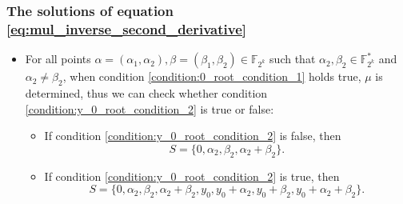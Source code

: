 \documentclass[
    aspectratio=169,                   %
]{beamer}
\newcommand{\Fks}{\mathbb{F}_{2^k}^*}
\newcommand{\Fk}{\mathbb{F}_{2^k}}
\begin{document}
    \begin{frame}
        \frametitle{The solutions of equation \eqref{eq:mul_inverse_second_derivative}}
        
        \begin{itemize}
            \item For all points $ \alpha=(\alpha_1,\alpha_2),\beta=(\beta_1,\beta_2)\in\Fk $ such that $ \alpha_2,\beta_2\in\Fks $ 
            and $ \alpha_2\ne\beta_2 $,
            when condition \eqref{condition:0_root_condition_1} holds true, $ \mu $ is determined, thus we can check whether 
            condition \eqref{condition:y_0_root_condition_2} is true or false: 
            \begin{itemize}
                \item[\ding{110}] If condition \eqref{condition:y_0_root_condition_2} is false, then 
                \[S = \{0,\alpha_2,\beta_2,\alpha_2+\beta_2\}.\] 
                \item[\ding{110}] If condition \eqref{condition:y_0_root_condition_2} is true, then 
                \[S = \{0,\alpha_2,\beta_2,\alpha_2+\beta_2,y_0,y_0+\alpha_2,y_0+\beta_2,y_0+\alpha_2+\beta_2\}.\] 
            \end{itemize}
        \end{itemize}
    \end{frame}
\end{document}
